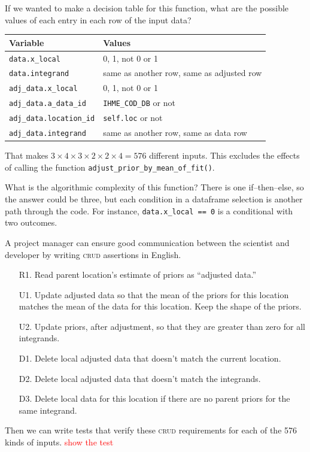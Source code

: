 \documentclass[fleqn,10pt]{olplainarticle}
\newcommand{\aside}[1]{\textcolor{red}{#1}}
\begin{document}
If we wanted to make a decision table for this function, what are
the possible values of each entry in each row of the input data?

\begin{center}
\begin{tabular}{|l|l|}
\hline Variable & Values \\ \hline
\lstinline!data.x_local! & 0, 1, not 0 or 1 \\
\lstinline!data.integrand! & same as another row, same as adjusted row \\
\lstinline!adj_data.x_local! & 0, 1, not 0 or 1 \\
\lstinline!adj_data.a_data_id! & \lstinline!IHME_COD_DB! or not \\
\lstinline!adj_data.location_id! & \lstinline!self.loc! or not \\
\lstinline!adj_data.integrand! & same as another row, same as data row \\ \hline
\end{tabular}
\end{center}

That makes $3\times 4 \times 3\times 2\times 2\times 4=576$ different inputs.
This excludes the effects of calling the function
\lstinline!adjust_prior_by_mean_of_fit()!.

What is the algorithmic complexity of this function? There is one
if--then--else, so the answer could be three, but each condition in a dataframe
selection is another path through the code. For instance,
\lstinline!data.x_local == 0! is a conditional with two outcomes.

A project manager can ensure good communication between the scientist and
developer by writing \textsc{crud} assertions in English.
\begin{itemize}
    \item[R1.] Read parent location's estimate of priors as ``adjusted data.''
    \item[U1.] Update adjusted data so that the mean of the priors for this location matches
        the mean of the data for this location. Keep the shape of the priors.
    \item[U2.] Update priors, after adjustment, so that they are greater
        than zero for all integrands.
    \item[D1.] Delete local adjusted data that doesn't match the current location.
    \item[D2.] Delete local adjusted data that doesn't match the integrands.
    \item[D3.] Delete local data for this location if there are no parent
        priors for the same integrand.
\end{itemize}
Then we can write tests that verify these \textsc{crud} requirements for
each of the 576 kinds of inputs. \aside{show the test}
\end{document}
